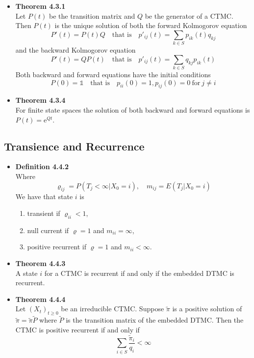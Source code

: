 \documentclass[11pt,a4paper]{article}
\begin{document}
\begin{itemize}
    \item \textbf{Theorem 4.3.1} \\
        Let $P(t)$ be the transition matrix and $Q$ be the generator of a CTMC\@.
        Then $P(t)$ is the unique solution of both the forward Kolmogorov equation
        \[
            P'(t) = P(t) Q \quad \text{that is} \quad p'_{ij}(t) = \sum_{k \in S}p_{ik}(t)q_{kj}
        \]
        and the backward Kolmogorov equation
        \[
            P'(t) = Q P(t) \quad \text{that is} \quad p'_{ij}(t) = \sum_{k \in S}q_{kj}p_{ik}(t)
        \]
        Both backward and forward equations have the initial conditions
        \[
            P(0) = \mathds{1} \quad \text{that is} \quad p_{ii}(0) = 1, p_{ij}(0) = 0 \
            \text{for} \ j \neq i
        \]

    \item \textbf{Theorem 4.3.4} \\
        For finite state spaces the solution of both backward and
        forward equations is
        $P(t) = \mathrm{e}^{Qt}$.

\end{itemize}

\subsection{Transience and Recurrence}

\begin{itemize}
    \item \textbf{Definition 4.4.2} \\
        Where
        \[
            \varrho_{ij} = P(T_j < \infty | X_0 = i), \quad m_{ij} = E(T_j | X_0 = i)
        \]
        We have that state $i$ is
        \begin{enumerate}
            \item transient if $\varrho_{ii} < 1$,
            \item null current if $\varrho = 1$ and $m_{ii} = \infty$,
            \item positive recurrent if $\varrho = 1$ and $m_{ii} < \infty$.
        \end{enumerate}

    \item \textbf{Theorem 4.4.3} \\
        A state $i$ for a CTMC is recurrent if and only if the embedded
        DTMC is recurrent.

    \item \textbf{Theorem 4.4.4} \\
        Let ${(X_t)}_{t \geq 0}$ be an irreducible CTMC\@.
        Suppose $\widetilde{\pi}$ is a positive solution of
        $\widetilde{\pi} = \widetilde{\pi} \widetilde{P}$ where $\widetilde{P}$ is the transition
        matrix of the embedded DTMC\@.
        Then the CTMC is positive recurrent if and only if
        \[
            \sum_{i \in S} \frac{\widetilde{\pi}_i}{q_i} < \infty
        \]

\end{itemize}
\end{document}
